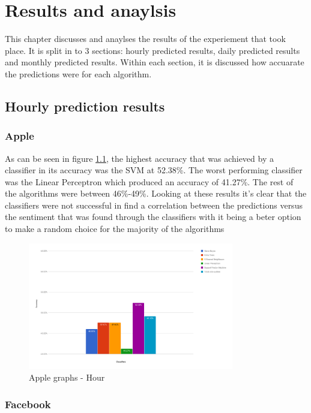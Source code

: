 \documentclass[a4paper,11pt]{report}
\begin{document}
\chapter{Results and anaylsis}
\label{chap:results}

This chapter discusses and anaylses the results of the experiement that took place. It is split in to 3 sections: hourly predicted results, daily predicted results and monthly predicted results. Within each section, it is discussed how accuarate the predictions were for each algorithm.

\section {Hourly prediction results}

\subsection{Apple}

As can be seen in figure \ref{apple-hour}, the highest accuracy that was achieved by a classifier in its accuracy was the SVM at 52.38\%. The worst performing classifier was the Linear Perceptron which produced an accuracy of 41.27\%. The rest of the algorithms were between 46\%-49\%. Looking at these results it's clear that the classifiers were not successful in find a correlation between the predictions versus the sentiment that was found through the classifiers with it being a beter option to make a random choice for the majority of the algorithms

\begin{figure}[h!]
	\label{apple-hour}
  \centering
  	\includegraphics[width=0.80\textwidth]{apple-hour.png}
  \caption{Apple graphs - Hour}
\end{figure}


\subsection{Facebook}
\end{document}
